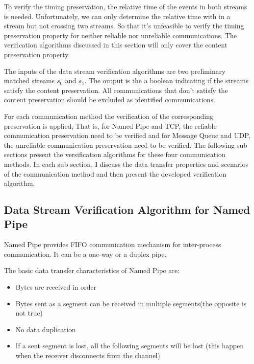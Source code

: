 To verify the timing preservation, the relative time of the events in both streams is needed. Unfortunately, we can only determine the relative time with in a stream but not crossing two streams. So that it's unfeasible to verify the timing preservation property for neither reliable nor unreliable communications. The verification algorithms discussed in this section will only cover the content preservation property.  

The inputs of the data stream verification algorithms are two preliminary matched streams $s_0$ and $s_1$. The output is the a boolean indicating if the streams satisfy the content preservation. All communications that don't satisfy the content preservation should be excluded as identified communications.

For each communication method the verification of the corresponding preservation is applied, That is, for Named Pipe and TCP, the reliable communication preservation need to be verified and for Message Queue and UDP, the unreliable communication preservation need to be verified. The following sub sections present the versification  algorithms for these four communication methods. In each sub section, I discuss the data transfer properties and scenarios of the communication method and then present the developed verification algorithm.

\subsection{Data Stream Verification Algorithm for Named Pipe}
Named Pipe provides FIFO communication mechanism for inter-process communication. It can be a one-way or a duplex pipe. \cite{khambattinamed}

The basic data transfer characteristics of Named Pipe are:
\begin{itemize}
  \item Bytes are received in order
  \item Bytes sent as a segment can be received in multiple segments(the opposite is not true)
  \item No data duplication
  \item If a sent segment is lost, all the following segments will be lost (this happen when the receiver disconnects from the channel) 
  
\end{itemize}

